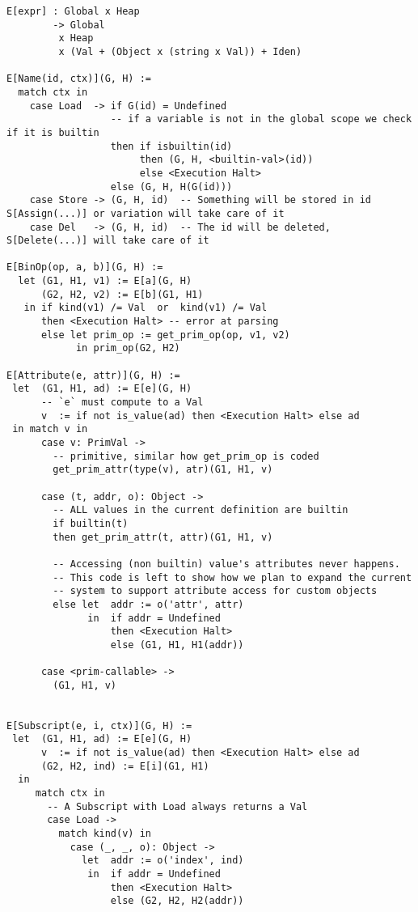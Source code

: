 \begin{verbatim}
E[expr] : Global x Heap
        -> Global
         x Heap
         x (Val + (Object x (string x Val)) + Iden)

E[Name(id, ctx)](G, H) :=
  match ctx in
    case Load  -> if G(id) = Undefined
                  -- if a variable is not in the global scope we check if it is builtin
                  then if isbuiltin(id)
                       then (G, H, <builtin-val>(id))
                       else <Execution Halt>
                  else (G, H, H(G(id)))
    case Store -> (G, H, id)  -- Something will be stored in id S[Assign(...)] or variation will take care of it
    case Del   -> (G, H, id)  -- The id will be deleted, S[Delete(...)] will take care of it

E[BinOp(op, a, b)](G, H) :=
  let (G1, H1, v1) := E[a](G, H)
      (G2, H2, v2) := E[b](G1, H1)
   in if kind(v1) /= Val  or  kind(v1) /= Val
      then <Execution Halt> -- error at parsing
      else let prim_op := get_prim_op(op, v1, v2)
            in prim_op(G2, H2)

E[Attribute(e, attr)](G, H) :=
 let  (G1, H1, ad) := E[e](G, H)
      -- `e` must compute to a Val
      v  := if not is_value(ad) then <Execution Halt> else ad
 in match v in
      case v: PrimVal ->
        -- primitive, similar how get_prim_op is coded
        get_prim_attr(type(v), atr)(G1, H1, v)

      case (t, addr, o): Object ->
        -- ALL values in the current definition are builtin
        if builtin(t)
        then get_prim_attr(t, attr)(G1, H1, v)

        -- Accessing (non builtin) value's attributes never happens.
        -- This code is left to show how we plan to expand the current
        -- system to support attribute access for custom objects
        else let  addr := o('attr', attr)
              in  if addr = Undefined
                  then <Execution Halt>
                  else (G1, H1, H1(addr))

      case <prim-callable> ->
        (G1, H1, v)


E[Subscript(e, i, ctx)](G, H) :=
 let  (G1, H1, ad) := E[e](G, H)
      v  := if not is_value(ad) then <Execution Halt> else ad
      (G2, H2, ind) := E[i](G1, H1)
  in
     match ctx in
       -- A Subscript with Load always returns a Val
       case Load ->
         match kind(v) in
           case (_, _, o): Object ->
             let  addr := o('index', ind)
              in  if addr = Undefined
                  then <Execution Halt>
                  else (G2, H2, H2(addr))


\end{verbatim}
